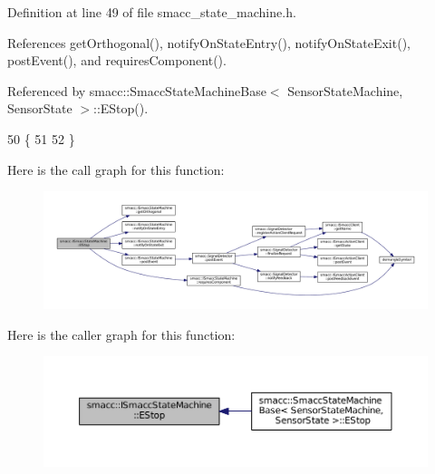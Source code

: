 Definition at line 49 of file smacc\+\_\+state\+\_\+machine.\+h.



References get\+Orthogonal(), notify\+On\+State\+Entry(), notify\+On\+State\+Exit(), post\+Event(), and requires\+Component().



Referenced by smacc\+::\+Smacc\+State\+Machine\+Base$<$ Sensor\+State\+Machine, Sensor\+State $>$\+::\+E\+Stop().


\begin{DoxyCode}
50     \{
51 
52     \}
\end{DoxyCode}


Here is the call graph for this function\+:
\nopagebreak
\begin{figure}[H]
\begin{center}
\leavevmode
\includegraphics[width=350pt]{classsmacc_1_1ISmaccStateMachine_af79fbc17f064bba77e598f5e55a86200_cgraph}
\end{center}
\end{figure}




Here is the caller graph for this function\+:
\nopagebreak
\begin{figure}[H]
\begin{center}
\leavevmode
\includegraphics[width=350pt]{classsmacc_1_1ISmaccStateMachine_af79fbc17f064bba77e598f5e55a86200_icgraph}
\end{center}
\end{figure}


